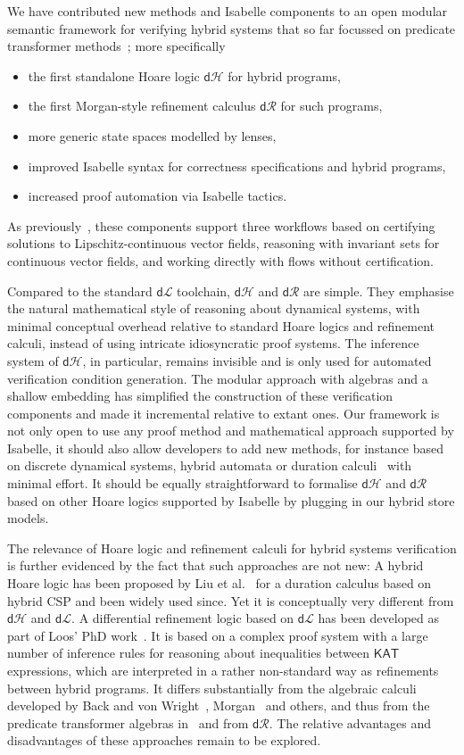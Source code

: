 \documentclass[envcountsame]{llncs}
\newcommand{\KAT}{\mathsf{KAT}}
\newcommand{\dL}{\mathsf{d}\mathcal{L}}
\newcommand{\dH}{\mathsf{d}\mathcal{H}}
\newcommand{\dR}{\mathsf{d}\mathcal{R}}
\begin{document}
We have contributed new methods and Isabelle components to an open
modular semantic framework for verifying hybrid systems that so far
focussed on predicate transformer methods~\cite{MuniveS19}; more
specifically
\begin{itemize}
\item the first standalone Hoare logic $\dH$ for hybrid programs, 
\item the first Morgan-style refinement calculus $\dR$ for such programs,
\item more generic state spaces modelled by lenses,
\item improved Isabelle syntax for correctness specifications
  and hybrid programs,
\item increased proof automation via Isabelle tactics. 
\end{itemize}
As previously~\cite{MuniveS19}, these components support three
workflows based on certifying solutions to Lipschitz-continuous vector
fields, reasoning with invariant sets for continuous vector fields,
and working directly with flows without certification. 

Compared to the standard $\dL$ toolchain, $\dH$ and $\dR$ are
simple. They emphasise the natural mathematical style of reasoning
about dynamical systems, with minimal conceptual overhead relative to
standard Hoare logics and refinement calculi, instead of using
intricate idiosyncratic proof systems. The inference system of $\dH$,
in particular, remains invisible and is only used for automated
verification condition generation. The modular approach with algebras
and a shallow embedding has simplified the construction of these
verification components and made it incremental relative to extant
ones. Our framework is not only open to use any proof method and
mathematical approach supported by Isabelle, it should also allow
developers to add new methods, for instance based on discrete
dynamical systems, hybrid automata or duration calculi~\cite{***} with
minimal effort. It should be equally straightforward to formalise
$\dH$ and $\dR$ based on other Hoare logics supported by Isabelle by
plugging in our hybrid store models.

The relevance of Hoare logic and refinement calculi for hybrid systems
verification is further evidenced by the fact that such approaches are
not new: A hybrid Hoare logic has been proposed by Liu et
al.~\cite{LiuLQZZZZ10} for a duration calculus based on hybrid CSP and
been widely used since. Yet it is conceptually very different from
$\dH$ and $\dL$. A differential refinement logic based on $\dL$ has
been developed as part of Loos' PhD work~\cite{LoosP16}.  It is based
on a complex proof system with a large number of inference rules for
reasoning about inequalities between $\KAT$ expressions, which are
interpreted in a rather non-standard way as refinements between hybrid
programs. It differs substantially from the algebraic calculi
developed by Back and von Wright~\cite{BackW98},
Morgan~\cite{Morgan94} and others, and thus from the predicate
transformer algebras in~\cite{MuniveS19} and from $\dR$.  The relative
advantages and disadvantages of these approaches remain to be
explored.
\end{document}

